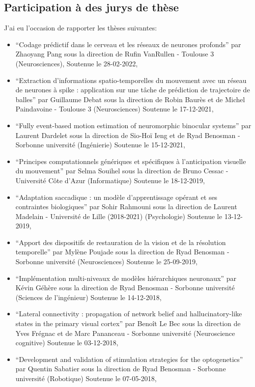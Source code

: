 \documentclass[10pt,french,a4paper,oneside]{article}%
\begin{document}
\subsection{Participation à des jurys de thèse} %

J'ai eu l'occasion de rapporter les thèses suivantes:
\begin{itemize}
	\item ``Codage prédictif dans le cerveau et les réseaux de neurones profonds'' 	par Zhaoyang Pang sous la direction de Rufin VanRullen - Toulouse 3 (Neurosciences), Soutenue le 28-02-2022,
	\item ``Extraction d'informations spatio-temporelles du mouvement avec un réseau de neurones à spike : application sur une tâche de prédiction de trajectoire de balles'' par Guillaume Debat sous la direction de Robin Baurès et de Michel Paindavoine - Toulouse 3  (Neurosciences) 	Soutenue le 17-12-2021,
	\item ``Fully event-based motion estimation of neuromorphic binocular systems'' par Laurent Dardelet sous la direction de Sio-Hoï Ieng et de Ryad Benosman - Sorbonne université (Ingénierie) Soutenue le 15-12-2021,
	\item ``Principes computationnels génériques et spécifiques à l’anticipation visuelle du mouvement'' par Selma Souihel sous la direction de Bruno Cessac - Université Côte d'Azur (Informatique) Soutenue le 18-12-2019,
	\item ``Adaptation saccadique : un modèle d’apprentissage opérant et ses contraintes biologiques'' par Sohir Rahmouni sous la direction de Laurent Madelain - Université de Lille (2018-2021)
	(Psychologie) Soutenue le 13-12-2019,
	\item ``Apport des dispositifs de restauration de la vision et de la résolution temporelle''  par Mylène Poujade sous la direction de Ryad Benosman - Sorbonne université	(Neurosciences) 	Soutenue le 25-09-2019,
	\item ``Implémentation multi-niveaux de modèles hiérarchiques neuronaux'' par Kévin Géhère sous la direction de Ryad Benosman - Sorbonne université 	(Sciences de l'ingénieur) Soutenue le 14-12-2018,
	\item ``Lateral connectivity : propagation of network belief and hallucinatory-like states in the primary visual cortex'' par Benoît Le Bec sous la direction de Yves Frégnac et de Marc Pananceau - Sorbonne université (Neuroscience cognitive) Soutenue le 03-12-2018,
	\item ``Development and validation of stimulation strategies for the optogenetics'' par Quentin Sabatier sous la direction de Ryad Benosman - Sorbonne université (Robotique) Soutenue le 07-05-2018,

\end{itemize}
\end{document}
